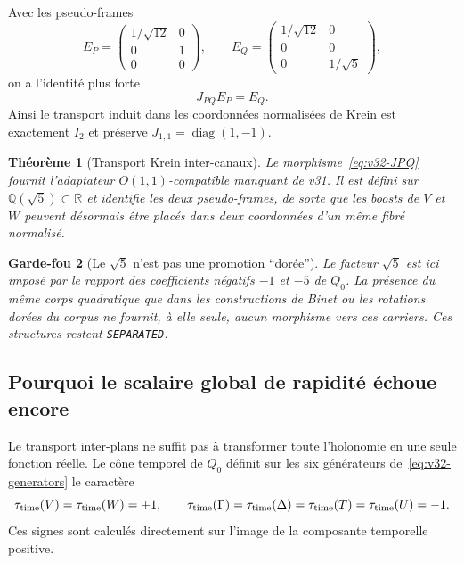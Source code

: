 \documentclass[11pt,a4paper]{article}
\newtheorem{theorem}{Théorème}[section]
\newtheorem{guardrail}[theorem]{Garde-fou}
\newcommand{\certSeparated}{\texttt{SEPARATED}}
\begin{document}
Avec les pseudo-frames
\[
 E_P=\begin{pmatrix}1/\sqrt{12}&0\\0&1\\0&0\end{pmatrix},
 \qquad
 E_Q=\begin{pmatrix}1/\sqrt{12}&0\\0&0\\0&1/\sqrt5\end{pmatrix},
\]
on a l'identité plus forte
\begin{equation}\label{eq:v32-frame-transport}
 \boxed{J_{PQ}E_P=E_Q.}
\end{equation}
Ainsi le transport induit dans les coordonnées normalisées de Krein est exactement $I_2$ et
préserve $J_{1,1}=\operatorname{diag}(1,-1)$.

\begin{theorem}[Transport Krein inter-canaux]\label{thm:v32-krein-transport}
Le morphisme~\eqref{eq:v32-JPQ} fournit l'adaptateur $O(1,1)$-compatible manquant de v31.
Il est défini sur $\mathbb Q(\sqrt5)\subset\mathbb R$ et identifie les deux pseudo-frames, de sorte
que les boosts de $V$ et $W$ peuvent désormais être placés dans deux coordonnées d'un même
fibré normalisé.
\end{theorem}

\begin{guardrail}[Le $\sqrt5$ n'est pas une promotion ``dorée'']
Le facteur $\sqrt5$ est ici imposé par le rapport des coefficients négatifs $-1$ et $-5$ de $Q_0$.
La présence du même corps quadratique que dans les constructions de Binet ou les rotations
dorées du corpus ne fournit, à elle seule, aucun morphisme vers ces carriers. Ces structures restent
\certSeparated{}.
\end{guardrail}

\subsection{Pourquoi le scalaire global de rapidité échoue encore}

Le transport inter-plans ne suffit pas à transformer toute l'holonomie en une seule fonction réelle.
Le cône temporel de $Q_0$ définit sur les six générateurs de~\eqref{eq:v32-generators} le caractère
\begin{equation}\label{eq:v32-time-character}
 \tau_{\rm time}(V)=\tau_{\rm time}(W)=+1,
 \qquad
 \tau_{\rm time}(\Gamma)=\tau_{\rm time}(\Delta)
 =\tau_{\rm time}(T)=\tau_{\rm time}(U)=-1.
\end{equation}
Ces signes sont calculés directement sur l'image de la composante temporelle positive.
\end{document}
